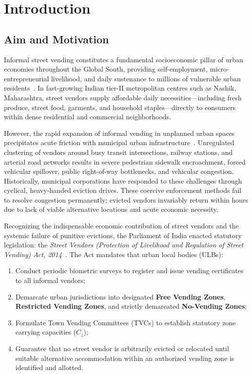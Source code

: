 \chapter{Introduction}
\label{ch:introduction}

\section{Aim and Motivation}
\label{sec:aim_motivation}

Informal street vending constitutes a fundamental socioeconomic pillar of urban economies throughout the Global South, providing self-employment, micro-entrepreneurial livelihood, and daily sustenance to millions of vulnerable urban residents~\cite{bhowmik2005street}. In fast-growing Indian tier-II metropolitan centres such as Nashik, Maharashtra, street vendors supply affordable daily necessities---including fresh produce, street food, garments, and household staples---directly to consumers within dense residential and commercial neighborhoods.

However, the rapid expansion of informal vending in unplanned urban spaces precipitates acute friction with municipal urban infrastructure~\cite{bromley2000street}. Unregulated clustering of vendors around busy transit intersections, railway stations, and arterial road networks results in severe pedestrian sidewalk encroachment, forced vehicular spillover, public right-of-way bottlenecks, and vehicular congestion. Historically, municipal corporations have responded to these challenges through cyclical, heavy-handed eviction drives. These coercive enforcement methods fail to resolve congestion permanently; evicted vendors invariably return within hours due to lack of viable alternative locations and acute economic necessity.

Recognizing the indispensable economic contribution of street vendors and the systemic failure of punitive evictions, the Parliament of India enacted statutory legislation: the \textit{Street Vendors (Protection of Livelihood and Regulation of Street Vending) Act, 2014}~\cite{india2014street}. The Act mandates that urban local bodies (ULBs):
\begin{enumerate}
    \item Conduct periodic biometric surveys to register and issue vending certificates to all informal vendors;
    \item Demarcate urban jurisdictions into designated \textbf{Free Vending Zones}, \textbf{Restricted Vending Zones}, and strictly demarcated \textbf{No-Vending Zones};
    \item Formulate Town Vending Committees (TVCs) to establish statutory zone carrying capacities ($C_z$);
    \item Guarantee that no street vendor is arbitrarily evicted or relocated until suitable alternative accommodation within an authorized vending zone is identified and allotted.
\end{enumerate}

